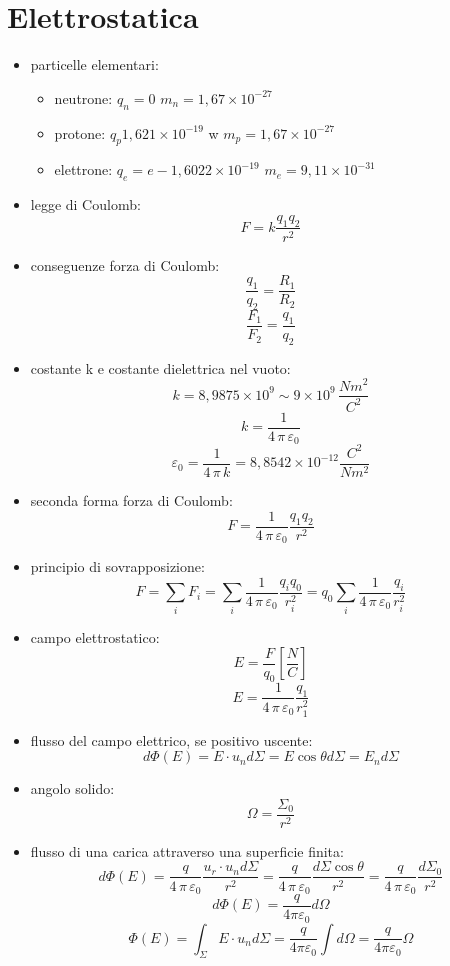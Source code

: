 \documentclass[a4paper,12pt, oneside]{book}
\begin{document}
\section{Elettrostatica}
\begin{itemize}
	\item particelle elementari:
	      \begin{itemize}
		      \item neutrone: $q_n=0$ $m_n=1,67\times 10^{-27}$
		      \item protone: $q_p1,621\times 10^{-19}$ w $m_p=1,67\times 10^{-27}$
		      \item elettrone: $q_e=e-1,6022\times 10^{-19}$ $m_e=9,11\times 10^{-31}$
	      \end{itemize}
	\item legge di Coulomb:
	      $$F=k\frac{q_1q_2}{r^2}$$
	\item conseguenze forza di Coulomb:
	      $$\frac{q_1}{q_2}=\frac{R_1}{R_2}$$
	      $$\frac{F_1}{F_2}=\frac{q_1}{q_2}$$
	\item costante k e costante dielettrica nel vuoto:
	      $$k=8,9875\times 10^9\sim 9\times 10^9\,\frac{Nm^2}{C^2}$$
	      $$k=\frac{1}{4\,\pi\,\varepsilon_0}$$
	      $$\varepsilon_0=\frac{1}{4\,\pi\,k}=8,8542\times 10^{-12}\frac{C^2}{Nm^2}$$
	\item seconda forma forza di Coulomb:
	      $$F=\frac{1}{4\,\pi\,\varepsilon_0}\frac{q_1q_2}{r^2}$$
	\item principio di sovrapposizione:
	      $$F=\sum_i F_i=\sum_i \frac{1}{4\,\pi\,\varepsilon_0}\frac{q_iq_0}{r_i^2}=q_0\sum_i\frac{1}{4\,\pi\,\varepsilon_0}\frac{q_i}{r_i^2}$$
	\item campo elettrostatico:
	      $$E=\frac{F}{q_0}\left[\frac{N}{C}\right]$$
	      $$E=\frac{1}{4\,\pi\,\varepsilon_0}\frac{q_1}{r_1^2}$$
	\item flusso del campo elettrico, se positivo uscente:
	      $$d\Phi(E)=E\cdot u_nd\Sigma=E\cos \theta d\Sigma=E_nd\Sigma$$
	\item angolo solido:
	      $$\Omega=\frac{\Sigma_0}{r^2}$$
	\item flusso di una carica attraverso una superficie finita:
	      $$d\Phi(E)=\frac{q}{4\,\pi\,\varepsilon_0}\frac{u_r\cdot u_nd\Sigma}{r^2}=\frac{q}{4\,\pi\,\varepsilon_0}\frac{d\Sigma\cos \theta}{r^2}=\frac{q}{4\,\pi\,\varepsilon_0}\frac{d\Sigma_0}{r^2}$$
	      $$d\Phi(E)=\frac{q}{4\pi\varepsilon_0}d\Omega$$
	      $$\Phi(E)=\int_\Sigma E\cdot u_nd\Sigma=\frac{q}{4\pi\varepsilon_0}\int d\Omega=\frac{q}{4\pi\varepsilon_0}\Omega$$

\end{itemize}
\end{document}
